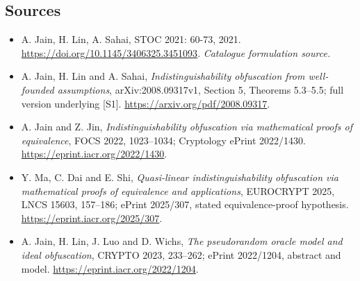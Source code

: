 \documentclass[11pt,a4paper]{article}
\numberwithin{equation}{section}
\begin{document}
\subsection{Sources}
\begin{itemize}\raggedright
\item[\textnormal{[S1]}]\hypertarget{source:30006749:1}{} A. Jain, H. Lin, A. Sahai, STOC 2021: 60-73, 2021.
\url{https://doi.org/10.1145/3406325.3451093}.
{\small\textit{Catalogue formulation source.}}
\item[\textnormal{[E1]}]\hypertarget{extra:30006749:1}{} A. Jain, H. Lin and A. Sahai,
\emph{Indistinguishability obfuscation from well-founded assumptions},
arXiv:2008.09317v1, Section 5, Theorems 5.3--5.5; full version underlying [S1].
\url{https://arxiv.org/pdf/2008.09317}.
\item[\textnormal{[E2]}]\hypertarget{extra:30006749:2}{} A. Jain and Z. Jin,
\emph{Indistinguishability obfuscation via mathematical proofs of equivalence},
FOCS 2022, 1023--1034; Cryptology ePrint 2022/1430.
\url{https://eprint.iacr.org/2022/1430}.
\item[\textnormal{[E3]}]\hypertarget{extra:30006749:3}{} Y. Ma, C. Dai and E. Shi,
\emph{Quasi-linear indistinguishability obfuscation via mathematical proofs
of equivalence and applications}, EUROCRYPT 2025, LNCS 15603, 157--186;
ePrint 2025/307, stated equivalence-proof hypothesis.
\url{https://eprint.iacr.org/2025/307}.
\item[\textnormal{[E4]}]\hypertarget{extra:30006749:4}{} A. Jain, H. Lin, J. Luo
and D. Wichs, \emph{The pseudorandom oracle model and ideal obfuscation},
CRYPTO 2023, 233--262; ePrint 2022/1204, abstract and model.
\url{https://eprint.iacr.org/2022/1204}.

\end{itemize}
\end{document}
